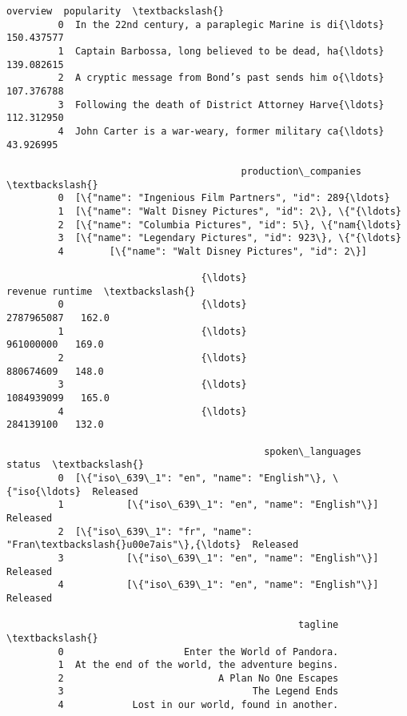 \documentclass[11pt]{article}
\begin{document}
\begin{Verbatim}[commandchars=\\\{\}]
                                                     overview  popularity  \textbackslash{}
         0  In the 22nd century, a paraplegic Marine is di{\ldots}  150.437577   
         1  Captain Barbossa, long believed to be dead, ha{\ldots}  139.082615   
         2  A cryptic message from Bond’s past sends him o{\ldots}  107.376788   
         3  Following the death of District Attorney Harve{\ldots}  112.312950   
         4  John Carter is a war-weary, former military ca{\ldots}   43.926995   
         
                                         production\_companies  \textbackslash{}
         0  [\{"name": "Ingenious Film Partners", "id": 289{\ldots}   
         1  [\{"name": "Walt Disney Pictures", "id": 2\}, \{"{\ldots}   
         2  [\{"name": "Columbia Pictures", "id": 5\}, \{"nam{\ldots}   
         3  [\{"name": "Legendary Pictures", "id": 923\}, \{"{\ldots}   
         4        [\{"name": "Walt Disney Pictures", "id": 2\}]   
         
                                  {\ldots}                             revenue runtime  \textbackslash{}
         0                        {\ldots}                          2787965087   162.0   
         1                        {\ldots}                           961000000   169.0   
         2                        {\ldots}                           880674609   148.0   
         3                        {\ldots}                          1084939099   165.0   
         4                        {\ldots}                           284139100   132.0   
         
                                             spoken\_languages    status  \textbackslash{}
         0  [\{"iso\_639\_1": "en", "name": "English"\}, \{"iso{\ldots}  Released   
         1           [\{"iso\_639\_1": "en", "name": "English"\}]  Released   
         2  [\{"iso\_639\_1": "fr", "name": "Fran\textbackslash{}u00e7ais"\},{\ldots}  Released   
         3           [\{"iso\_639\_1": "en", "name": "English"\}]  Released   
         4           [\{"iso\_639\_1": "en", "name": "English"\}]  Released   
         
                                                   tagline  \textbackslash{}
         0                     Enter the World of Pandora.   
         1  At the end of the world, the adventure begins.   
         2                           A Plan No One Escapes   
         3                                 The Legend Ends   
         4            Lost in our world, found in another.   
         

\end{Verbatim}
\end{document}

